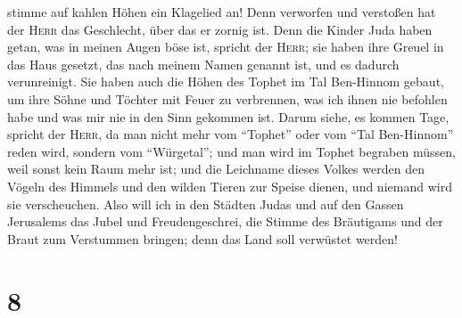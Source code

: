 stimme auf kahlen Höhen ein Klagelied an! Denn verworfen und verstoßen
hat der \textsc{Herr} das Geschlecht, über das er zornig ist.
 Denn die Kinder Juda haben getan, was in meinen Augen
böse ist, spricht der \textsc{Herr}; sie haben ihre Greuel in das Haus
gesetzt, das nach meinem Namen genannt ist, und es dadurch verunreinigt.
 Sie haben auch die Höhen des Tophet im Tal Ben-Hinnom
gebaut, um ihre Söhne und Töchter mit Feuer zu verbrennen, was ich ihnen
nie befohlen habe und was mir nie in den Sinn gekommen ist.
 Darum siehe, es kommen Tage, spricht der \textsc{Herr},
da man nicht mehr vom ``Tophet'' oder vom ``Tal Ben-Hinnom'' reden wird,
sondern vom ``Würgetal''; und man wird im Tophet begraben müssen, weil
sonst kein Raum mehr ist;  und die Leichname dieses
Volkes werden den Vögeln des Himmels und den wilden Tieren zur Speise
dienen, und niemand wird sie verscheuchen.  Also will ich
in den Städten Judas und auf den Gassen Jerusalems das Jubel und
Freudengeschrei, die Stimme des Bräutigams und der Braut zum Verstummen
bringen; denn das Land soll verwüstet werden!

\hypertarget{section-7}{%
\section{8}\label{section-7}}

